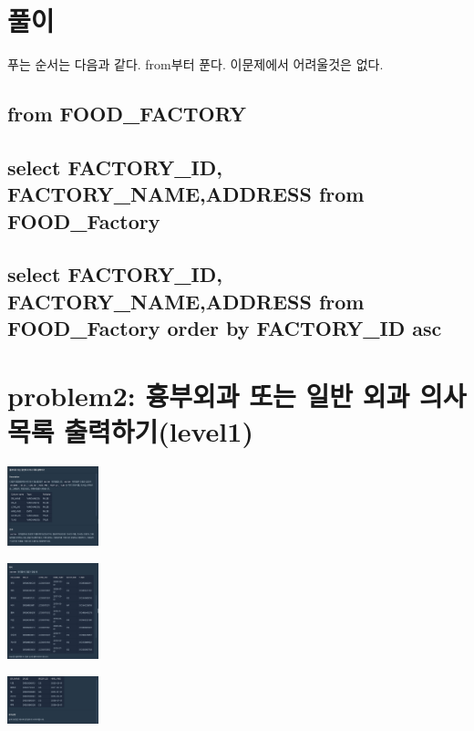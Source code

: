 \documentclass[11pt]{article}
\begin{document}
\section*{풀이}
\label{sec:org4b03bce}
푸는 순서는 다음과 같다. from부터 푼다. 이문제에서 어려울것은 없다. 
\subsection*{from FOOD\_FACTORY}
\label{sec:org2bafc1d}
\subsection*{select FACTORY\_ID, FACTORY\_NAME,ADDRESS from FOOD\_Factory}
\label{sec:org9201c04}
\subsection*{select FACTORY\_ID, FACTORY\_NAME,ADDRESS from FOOD\_Factory order by FACTORY\_ID asc}
\label{sec:org88363c1}

\section*{problem2: 흉부외과 또는 일반 외과 의사 목록 출력하기(level1)}
\label{sec:org832083b}
\begin{center}
\includegraphics[width=100px]{../static/img/sql/p2-1.png}
\end{center}
\begin{center}
\includegraphics[width=100px]{../static/img/sql/p2-2.png}
\end{center}
\begin{center}
\includegraphics[width=100px]{../static/img/sql/p2-3.png}
\end{center}
\end{document}
